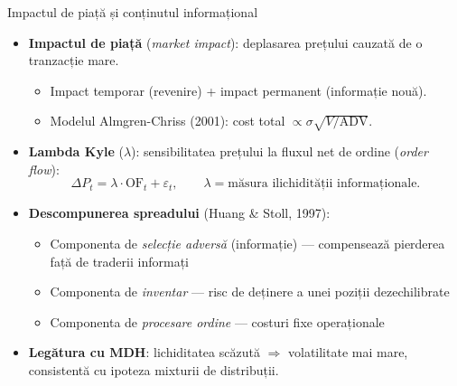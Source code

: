 \documentclass[9pt, aspectratio=169, t]{beamer}
\theoremstyle{definition}
\begin{document}
\begin{frame}{Impactul de piață și conținutul informațional}
\begin{itemize}\setlength{\itemsep}{2pt}
    \item \textbf{Impactul de piață} (\textit{market impact}): deplasarea prețului cauzată de o tranzacție mare.
    \begin{itemize}
        \item Impact temporar (revenire) + impact permanent (informație nouă).
        \item Modelul Almgren-Chriss (2001): cost total $\propto \sigma \sqrt{V/\text{ADV}}$.
    \end{itemize}
    \item \textbf{Lambda Kyle} ($\lambda$): sensibilitatea prețului la fluxul net de ordine (\textit{order flow}):
    \[
    \Delta P_t = \lambda \cdot \text{OF}_t + \varepsilon_t, \qquad \lambda = \text{măsura ilichidității informaționale}.
    \]
    \item \textbf{Descompunerea spreadului} (Huang \& Stoll, 1997):
    \begin{itemize}
        \item Componenta de \textit{selecție adversă} (informație) --- compensează pierderea față de traderii informați
        \item Componenta de \textit{inventar} --- risc de deținere a unei poziții dezechilibrate
        \item Componenta de \textit{procesare ordine} --- costuri fixe operaționale
    \end{itemize}
    \item \textbf{Legătura cu MDH}: lichiditatea scăzută $\Rightarrow$ volatilitate mai mare, consistentă cu ipoteza mixturii de distribuții.
\end{itemize}
\end{frame}
\end{document}
